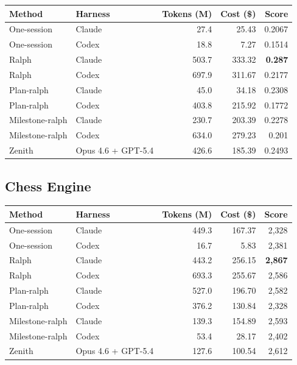 \documentclass[11pt,a4paper]{article}
\newcommand{\code}[1]{#1}
\begin{document}
\noindent\begin{tabular}{@{}llrrr@{}}
\toprule
\rowcolor{tablehead}\textbf{\color{white}Method} & \textbf{\color{white}Harness} & \textbf{\color{white}Tokens (M)} & \textbf{\color{white}Cost (\$)} & \textbf{\color{white}Score} \\
\midrule
\code{One-session}    & Claude              & 27.4   & 25.43   & 0.2067 \\
\rowcolor{tableband}
\code{One-session}    & Codex               & 18.8   & 7.27    & 0.1514 \\
\code{Ralph}          & Claude              & 503.7  & 333.32  & \textbf{0.287} \\
\rowcolor{tableband}
\code{Ralph}          & Codex               & 697.9  & 311.67  & 0.2177 \\
\code{Plan-ralph}     & Claude              & 45.0   & 34.18   & 0.2308 \\
\rowcolor{tableband}
\code{Plan-ralph}     & Codex               & 403.8  & 215.92  & 0.1772 \\
\code{Milestone-ralph}& Claude              & 230.7  & 203.39  & 0.2278 \\
\rowcolor{tableband}
\code{Milestone-ralph}& Codex               & 634.0  & 279.23  & 0.201 \\
\code{Zenith}         & Opus 4.6 + GPT-5.4  & 426.6  & 185.39  & 0.2493 \\
\bottomrule
\end{tabular}

\subsection*{Chess Engine}

\noindent\begin{tabular}{@{}llrrr@{}}
\toprule
\rowcolor{tablehead}\textbf{\color{white}Method} & \textbf{\color{white}Harness} & \textbf{\color{white}Tokens (M)} & \textbf{\color{white}Cost (\$)} & \textbf{\color{white}Score} \\
\midrule
\code{One-session}    & Claude              & 449.3  & 167.37  & 2{,}328 \\
\rowcolor{tableband}
\code{One-session}    & Codex               & 16.7   & 5.83    & 2{,}381 \\
\code{Ralph}          & Claude              & 443.2  & 256.15  & \textbf{2{,}867} \\
\rowcolor{tableband}
\code{Ralph}          & Codex               & 693.3  & 255.67  & 2{,}586 \\
\code{Plan-ralph}     & Claude              & 527.0  & 196.70  & 2{,}582 \\
\rowcolor{tableband}
\code{Plan-ralph}     & Codex               & 376.2  & 130.84  & 2{,}328 \\
\code{Milestone-ralph}& Claude              & 139.3  & 154.89  & 2{,}593 \\
\rowcolor{tableband}
\code{Milestone-ralph}& Codex               & 53.4   & 28.17   & 2{,}402 \\
\code{Zenith}         & Opus 4.6 + GPT-5.4  & 127.6  & 100.54  & 2{,}612 \\
\bottomrule
\end{tabular}
\end{document}
